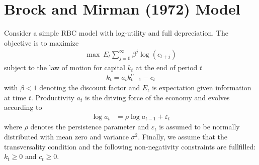 \section[Brock and Mirman (1972) Model]{Brock and Mirman (1972) Model\label{ex:BrockMirmanPolicyFunction}}
Consider a simple RBC model with log-utility and full depreciation.
The objective is to maximize
\begin{align*}
\max ~E_t \sum_{j=0}^{\infty} \beta^{j} \log(c_{t+j})
\end{align*}
subject to the law of motion for capital $k_t$ at the end of period $t$
\begin{align}
k_{t} = a_t k_{t-1}^\alpha - c_t \label{eq:BrockMirmanCapital}
\end{align}
with $\beta <1$ denoting the discount factor and $E_t$ is expectation given information at time $t$.
Productivity $a_t$ is the driving force of the economy and evolves according to
\begin{align}
\log{a_{t}} &= \rho \log{a_{t-1}}  + \varepsilon_{t} \label{eq:BrockMirmanTFP}
\end{align}
where $\rho$ denotes the persistence parameter
  and $\varepsilon_{t}$ is assumed to be normally distributed with mean zero and variance $\sigma^2$.
Finally, we assume that the transversality condition and 
  the following non-negativity constraints are fullfilled: $k_t \geq0$ and $c_t \geq 0$.

